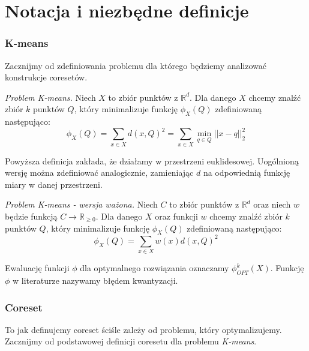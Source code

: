 \chapter{Notacja i niezbędne definicje}\label{preliminaries}
\subsection{K-means}

Zacznijmy od zdefiniowania problemu dla którego będziemy analizować konstrukcje coresetów.

\begin{definition}
    \emph{Problem K-means.} Niech $X$ to zbiór punktów z $\mathbb{R}^{d}$. 
    Dla danego $X$ chcemy znalźć zbiór $k$ punktów $Q$, który minimalizuje funkcję $\phi_{X}(Q)$ zdefiniowaną następująco:
    \begin{equation}
        \phi_{X}(Q) = \sum_{x \in X} d(x, Q)^{2} = \sum_{x \in X} \min_{q \in Q} || x - q ||_{2}^{2} 
    \end{equation}
\end{definition}

\noindent
Powyższa definicja zakłada, że działamy w przestrzeni euklidesowej.
Uogólnioną wersję można zdefiniować analogicznie, zamieniając $d$ na odpowiednią funkcję miary w danej przestrzeni.

\begin{definition}
    \emph{Problem K-means - wersja ważona.} Niech $C$ to zbiór punktów z $\mathbb{R}^{d}$ oraz niech $w$ będzie funkcją $C \rightarrow \mathbb{R}_{\ge0}$. 
    Dla danego $X$ oraz funkcji $w$ chcemy znalźć zbiór $k$ punktów $Q$, który minimalizuje funkcję $\phi_{X}(Q)$ zdefiniowaną następująco:
    \begin{equation}
        \phi_{X}(Q) = \sum_{x \in X} w(x) d(x, Q)^{2}
    \end{equation}
\end{definition}

\noindent
Ewaluację funkcji $\phi$ dla optymalnego rozwiązania oznaczamy $\phi_{OPT}^{k}(X)$. 
Funkcję $\phi$ w literaturze nazywamy błędem kwantyzacji.

\subsection{Coreset}

To jak definujemy coreset ściśle zależy od problemu, który optymalizujemy.
Zacznijmy od podstawowej definicji coresetu dla problemu \textit{K-means}.

